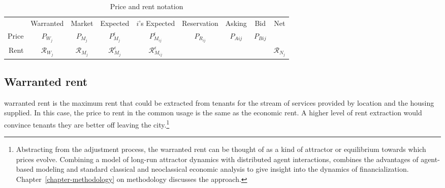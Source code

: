

\begin{table}[!ht]
\centering
{\renewcommand{\arraystretch}{1.6}
\begin{tabular}{r|c|c|c|c|c|c|c|c|}\cline{2-9}
       & Warranted  & Market & Expected & $i$'s Expected & Reservation & Asking & Bid &Net    \\ \cline{2-9}
Price  & $P_{W_j}$      & $P_{M_j}$  & $P_{M_j}^\epsilon$ & $P_{M_{ij}}^{\epsilon}$     & $P_{R_{ij}}$       & $P_{A{ij}}$  & $P_{B{ij}}$ &  \\ \cline{2-9}
Rent  & $\mathcal{R}_{W_j}$      & $\mathcal{R}_{M_j}$  & $\mathcal{R}_{M_j}^\epsilon$ & $\mathcal{R}_{M_{ij}}^{\epsilon}$     &       &   &  & $\mathcal{R}_{N_j} $\\ \cline{2-9}
\end{tabular}
 }   

\caption{Price and rent notation}
\label{table-price-notation}
\end{table}




\subsection{Warranted rent}\label{sec:warranted-rent}
\Gls{warranted rent} is the maximum rent that could be extracted from tenants for the stream of services provided by location and the housing supplied. In this case, the price to rent in the common usage is the same as the economic rent. A higher level of rent extraction would convince tenants they are better off leaving the city.\footnote{Abstracting from the adjustment process, the warranted rent can be thought of as a kind of \gls{attractor} or \gls{equilibrium} towards which prices evolve.  %
Combining a model of long-run attractor dynamics with distributed agent interactions, combines the advantages of agent-based modeling and standard \gls{classical} and \gls{neoclassical} economic analysis to give insight into the dynamics of financialization. Chapter~\ref{chapter-methodology} on methodology discusses the approach.} 

